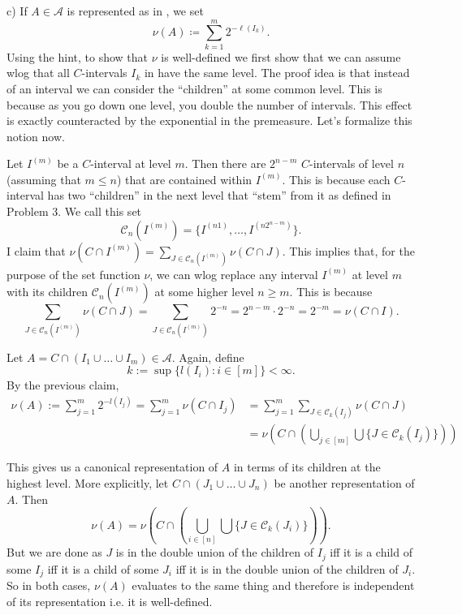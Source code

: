 \documentclass[12pt]{amsart} %
\def\C{\mathcal{C}}
\def\A{\mathcal{A}}
\begin{document}
\smallskip
c) If $A\in \mathcal{A}$ is represented as in , we set 
$$\nu(A)\coloneq\sum_{k=1}^m 2^{-\ell(I_k)}. $$
Using the hint, to show that $\nu$ is well-defined we first show that we can assume wlog that all 
$C$-intervals $I_k$ in have the same level. The proof idea is that instead of an interval we can consider the ``children'' at some common level. This is because as you go down one level, you double the number of intervals. This effect is exactly counteracted by the exponential in the premeasure. Let's formalize this notion now. 

Let $I^{(m)}$ be a  $C$-interval at level  $m$. Then there are  $2^{n-m}$  $C$-intervals of level  $n$ (assuming that $m \le n$) that are contained within $I^{(m)}$. This is because each  $C$-interval has two ``children'' in the next level that ``stem'' from it as defined in Problem 3. We call this set $$\C_n(I^{(m)}) =\{ I^{(n1)}, \ldots, I^{(n2^{n-m})} \}.$$ I claim that $\nu\left(C \cap I^{(m)} \right) = \sum_{J \in \C_n(I^{(m)})} \nu\left( C \cap J \right)$. This implies that, for the purpose of the set function $\nu$, we can wlog replace any interval $I^{(m)}$ at level $m$ with its children $\C_n\left( I^{(m)} \right) $ at some higher level $n \ge  m$. This is because $$\sum_{J \in \C_n(I^{(m)})} \nu\left(C \cap J \right) = \sum_{J \in \C_n(I^{(m)})} 2^{-n} = 2^{n-m} \cdot 2^{-n} = 2^{-m} = \nu(C \cap I).$$  

Let $A = C\cap \left( I_1 \cup \ldots \cup I_m \right) \in \A$. Again, define $$k := \sup \{l(I_i): i \in [m]\} < \infty.$$ By the previous claim, 
\begin{align*}
	\nu(A) := \sum_{j=1}^{m} 2^{-l(I_j)} = \sum_{j=1}^{m} \nu(C \cap I_j) &= \sum_{j=1}^{m} \sum_{J \in \C_k(I_j)} \nu(C \cap J) \\
									      &= \nu\left( C \cap \left( \bigcup_{j \in [m]} \bigcup\{J \in \C_k\left( I_j \right) \}   \right)  \right)  	
\end{align*}


This gives us a canonical representation of $A$ in terms of its children at the highest level. More explicitly, let  $C \cap \left( J_1 \cup \ldots\cup J_n  \right)$ be another representation of $A$. Then  $$\nu(A) = \nu\left( C \cap \left( \bigcup_{i \in [n]} \bigcup\{J \in \C_k\left( J_i \right) \}   \right)  \right).$$ But we are done as $J$ is in the double union of the children of $I_j$ iff it is a child of some  $I_j$ iff it is a child of some  $J_i$ iff it is in the double union of the children of  $J_i$. So in both cases,  $\nu(A)$ evaluates to the same thing and therefore is independent of its representation i.e. it is well-defined.
\end{document}
